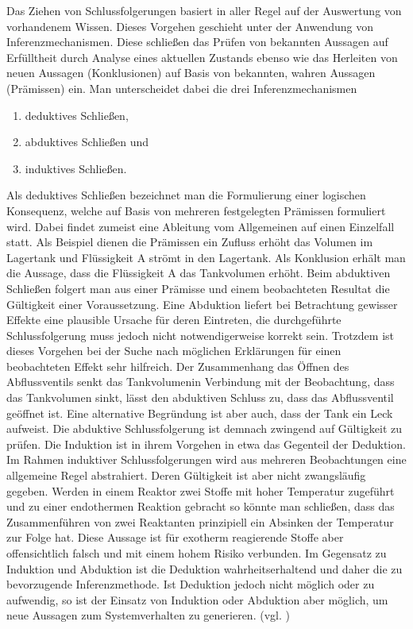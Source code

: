 Das Ziehen von Schlussfolgerungen basiert in aller Regel auf der Auswertung von vorhandenem Wissen. Dieses Vorgehen geschieht unter der Anwendung von \glqq Inferenzmechanismen\grqq { }. Diese schlie\ss{}en das Pr\"ufen von bekannten Aussagen auf Erf\"ulltheit durch Analyse eines aktuellen Zustands ebenso wie das Herleiten von neuen Aussagen (Konklusionen) auf Basis von bekannten, wahren Aussagen (Pr\"amissen) ein. Man unterscheidet dabei die drei Inferenzmechanismen \begin{enumerate}
\item deduktives Schlie\ss{}en,
\item abduktives Schlie\ss{}en und
\item induktives Schlie\ss{}en.
\end{enumerate} 
Als deduktives Schlie\ss{}en bezeichnet man die Formulierung einer logischen Konsequenz, welche auf Basis von mehreren festgelegten Pr\"amissen formuliert wird. Dabei findet zumeist eine Ableitung vom Allgemeinen auf einen Einzelfall statt. Als Beispiel dienen die Pr\"amissen ein Zufluss erh\"oht das Volumen im Lagertank und Fl\"ussigkeit A str\"omt in den Lagertank. Als Konklusion erh\"alt man die Aussage, dass die Fl\"ussigkeit A das Tankvolumen erh\"oht. \newline
Beim abduktiven Schlie\ss{}en folgert man aus einer Pr\"amisse und einem beobachteten Resultat die G\"ultigkeit einer Voraussetzung. Eine Abduktion liefert bei Betrachtung gewisser Effekte eine plausible Ursache f\"ur deren Eintreten, die durchgef\"uhrte Schlussfolgerung muss jedoch nicht notwendigerweise korrekt sein. Trotzdem ist dieses Vorgehen bei der Suche nach m\"oglichen Erkl\"arungen f\"ur einen beobachteten Effekt sehr hilfreich. Der Zusammenhang \glqq das \"Offnen des Abflussventils senkt das Tankvolumen\grqq { }in Verbindung mit der Beobachtung, dass das Tankvolumen sinkt, l\"asst den abduktiven Schluss zu, dass das Abflussventil ge\"offnet ist. Eine alternative Begr\"undung ist aber auch, dass der Tank ein Leck aufweist. Die abduktive Schlussfolgerung ist demnach zwingend auf G\"ultigkeit zu pr\"ufen. \newline
Die Induktion ist in ihrem Vorgehen in etwa das Gegenteil der Deduktion. Im Rahmen induktiver Schlussfolgerungen wird aus mehreren Beobachtungen eine allgemeine Regel abstrahiert. Deren G\"ultigkeit ist aber nicht zwangsl\"aufig gegeben. Werden in einem Reaktor zwei Stoffe mit hoher Temperatur zugef\"uhrt und zu einer endothermen Reaktion gebracht so k\"onnte man schlie\ss{}en, dass das Zusammenf\"uhren von zwei Reaktanten prinzipiell ein Absinken der Temperatur zur Folge hat. Diese Aussage ist f\"ur exotherm reagierende Stoffe aber offensichtlich falsch und mit einem hohem Risiko verbunden. \newline
Im Gegensatz zu Induktion und Abduktion ist die Deduktion wahrheitserhaltend und daher die zu bevorzugende Inferenzmethode. Ist Deduktion jedoch nicht m\"oglich oder zu aufwendig, so ist der Einsatz von Induktion oder Abduktion aber m\"oglich, um neue Aussagen zum Systemverhalten zu generieren. {(vgl. \cite[S. 28 ff.]{Dengel_2012})}



